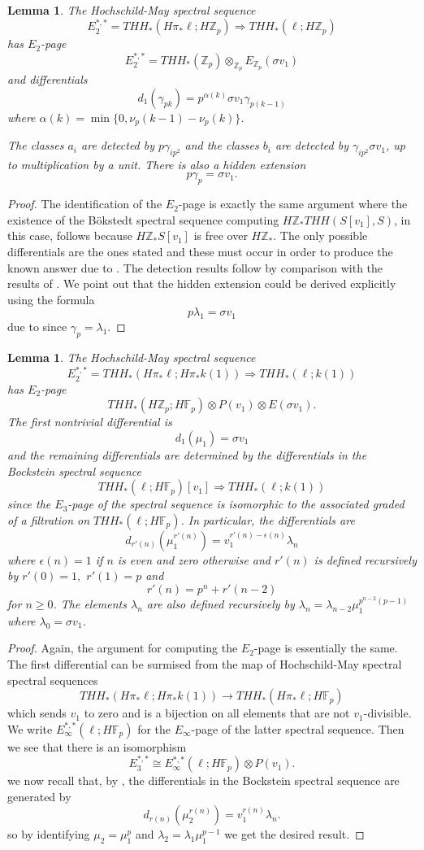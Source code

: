 \documentclass[12pt]{amsart}
\newcommand{\Z}{\mathbb{Z}}
\newcommand{\F}{\mathbb{F}}
\newtheorem{lem}[equation]{Lemma}
\theoremstyle{definition}
\numberwithin{equation}{section}
\numberwithin{figure}{section}
\begin{document}
\begin{lem}
The Hochschild-May spectral sequence
\[ E_2^{*,*}=THH_*(H\pi_*\ell;H\Z_p)\Rightarrow THH_*(\ell;H\Z_p)\]
has $E_2$-page
\[E_2^{*,*}= THH_*(\Z_p)\otimes_{\Z_p} E_{\Z_p}(\sigma v_1)\]
and differentials 
\[ d_1(\gamma_{pk})=p^{\alpha(k)} \sigma v_1 \gamma_{p(k-1)}\]
where $\alpha(k)=\min\{0,\nu_p(k-1)-\nu_p(k)\}$.

The classes $a_i$ are detected by $p\gamma_{ip^2}$ and the classes $b_i$ are detected by $\gamma_{ip^2}\sigma v_1$, up to multiplication by a unit. There is also a hidden extension 
\[ p\gamma_p=\sigma v_1.\]
\end{lem}
\begin{proof}
The identification of the $E_2$-page is exactly the same argument where the existence of the B\"okstedt spectral sequence computing $H\Z_*THH(S[v_1],S)$, in this case, follows because $H\Z_*S[v_1]$ is free over $H\Z_*$. The only possible differentials are the ones stated and these must occur in order to produce the known answer due to \cite{AHL}. The detection results follow by comparison with the results of \cite{AHL}. We point out that the hidden extension could be derived explicitly using the formula 
\[ p\lambda_1=\sigma v_1\]
due to \cite{Rog19} since $\gamma_p=\lambda_1$. 
\end{proof}
\begin{lem}
The Hochschild-May spectral sequence
\[ E_2^{*,*}=THH_*(H\pi_*\ell;H\pi_*k(1))\Rightarrow THH_*(\ell;k(1))\]
has $E_2$-page
\[ THH_*(H\Z_p;H\F_p)\otimes P(v_1)\otimes E(\sigma v_1).\]
The first nontrivial differential is 
\[ d_{1}(\mu_1)=\sigma v_1 \]
and the remaining differentials are determined by the differentials in the Bockstein spectral sequence 
\[ THH_*(\ell;H\F_p)[v_1]\Rightarrow THH_*(\ell;k(1))\]
since the $E_3$-page of the spectral sequence is isomorphic to the associated graded of a filtration on $THH_*(\ell;H\F_p)$. In particular, the differentials are 
\[ d_{r'(n)}(\mu_1^{r'(n)})=v_1^{r'(n)-\epsilon(n)}\lambda_n\]
where $\epsilon(n)=1$ if $n$ is even and zero otherwise and $r'(n)$ is defined recursively by $r'(0)=1,$ $r'(1)=p$ and 
\[ r'(n)=p^n+r'(n-2)\]
for $n\ge 0$.
The elements $\lambda_n$ are also defined recursively by $\lambda_n=\lambda_{n-2}\mu_1^{p^{n-2}(p-1)}$ where $\lambda_0=\sigma v_1$.
\end{lem}
\begin{proof}
Again, the argument for computing the $E_2$-page is essentially the same. The first differential can be surmised from the map of Hochschild-May spectral spectral sequences
\[ THH_*(H\pi_*\ell;H\pi_*k(1))\to THH_*(H\pi_*\ell;H\F_p)\]
which sends $v_1$ to zero and is a bijection on all elements that are not $v_1$-divisible. We write $E_{\infty}^{*,*}(\ell;H\F_p)$ for the $E_{\infty}$-page of the latter spectral sequence. Then we see that there is an isomorphism 
\[ E_3^{*,*}\cong E_{\infty}^{*,*}(\ell;H\F_p)\otimes P(v_1).\]
we now recall that, by \cite{MS}, the differentials in the Bockstein spectral sequence are generated by 
\[ d_{r(n)}(\mu_2^{r(n)})=v_1^{r(n)}\lambda_n.\]
so by identifying $\mu_2=\mu_1^p$ and $\lambda_2=\lambda_1\mu_1^{p-1}$ we get the desired result.
\end{proof}


\end{document}

